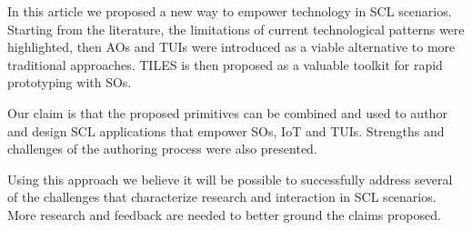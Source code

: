 In this article we proposed a new way to empower technology in SCL scenarios. Starting from the literature, the limitations of current technological patterns were highlighted, then AOs and TUIs were introduced as a viable alternative to more traditional approaches. TILES is then proposed as a valuable toolkit for rapid prototyping with SOs.

Our claim is that the proposed primitives can be combined and used to author and design SCL applications that empower SOs, IoT and TUIs. Strengths and challenges of the authoring process were also presented.

Using this approach we believe it will be possible to successfully address several of the challenges that characterize research and interaction in SCL scenarios. More research and feedback are needed to better ground the claims proposed.
